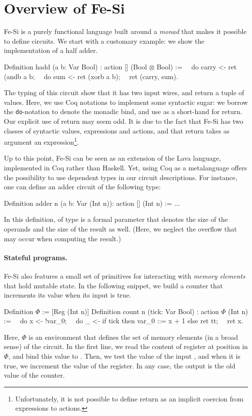 \documentclass[preprint]{sigplanconf}
\begin{document}

\section{Overview of Fe-Si}
Fe-Si is a purely functional language built around a \emph{monad} that
makes it possible to define circuits. We start with a customary
example: we show the implementation of a half adder.
\begin{coq}
Definition hadd (a b: Var Bool) : action [] (Bool $\otimes$ Bool) :=
$\quad$do carry <- ret (andb a b; 
$\quad$do sum     <- ret (xorb a b);
$\quad$ret (carry, sum).  
\end{coq}
The typing of this circuit show that it has two input wires, and
return a tuple of values. 
%
Here, we use Coq notations to implement some syntactic sugar: we
borrow the \texttt{do}-notation to denote the monadic bind, and use
 as a short-hand for return. 
% 
Our explicit use of return may seem odd. It is due to the fact that
Fe-Si has two classes of syntactic values, expressions and actions,
and that return takes as argument an
expression\footnote{Unfortunately, it is not possible to define return
  as an implicit coercion from expressions to actions.}. 

Up to this point, Fe-Si can be seen as an extension of the Lava
language, implemented in Coq rather than Haskell. Yet, using Coq as a
metalanguage offers the possibility to use dependent types in our
circuit descriptions. For instance, one can define an adder circuit of
the following type:
\begin{coq}
Definition adder n (a b: Var (Int n)): action [] (Int n) := ...
\end{coq}
In this definition,  of type  is a formal parameter
that denotes the size of the operands and the size of the result as
well. (Here, we neglect the overflow that may occur when computing the
result.)

\paragraph{Stateful programs.}
Fe-Si also features a small set of primitives for interacting with
\emph{memory elements} that hold mutable state. In the following
snippet, we build a counter that increments its value when its input
is true.
\begin{coq}
Definition $\Phi$ := [Reg (Int n)]
Definition count n (tick: Var Bool) : action $\Phi$ (Int n) :=
$\quad$do x <- !var_0;
$\quad$do _ <- if tick then {var_0 ::= x + 1} else {ret tt}; 
$\quad$ret x. 
\end{coq}
Here, $\Phi$ is an environment that defines the set of memory elements
(in a broad sense) of the circuit. In the first line, we read the
content of register at position  in $\Phi$, and bind this
value to . Then, we test the value of the input ,
and when it is true, we increment the value of the register. In any
case, the output is the old value of the counter.
\end{document}
